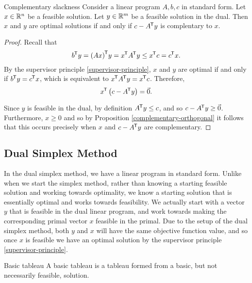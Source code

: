 \begin{thm}{Complementary slackness}\label{complementary-slackness}\proofbreak
    Consider a linear program $A, b, c$ in standard form. Let $x \in \mathbb{R}^n$ be a feasible solution. Let $y \in \mathbb{R}^m$ be a feasible solution in the dual. Then $x$ and $y$ are optimal solutions if and only if $c - {A}^{\mkern-1.5mu\mathsf{T}}y$ is complentary to $x$.
\end{thm}

\begin{proof}
    Recall that
    \begin{align*}
        {b}^{\mkern-1.5mu\mathsf{T}}y = {(Ax)}^{\mkern-1.5mu\mathsf{T}}y = {x}^{\mkern-1.5mu\mathsf{T}}{A}^{\mkern-1.5mu\mathsf{T}}y \leq {x}^{\mkern-1.5mu\mathsf{T}}c = {c}^{\mkern-1.5mu\mathsf{T}}x.
    \end{align*}
    By the supervisor principle \ref{supervisor-principle}, $x$ and $y$ are optimal if and only if ${b}^{\mkern-1.5mu\mathsf{T}}y = {c}^{\mkern-1.5mu\mathsf{T}}x$, which is equivalent to ${x}^{\mkern-1.5mu\mathsf{T}}{A}^{\mkern-1.5mu\mathsf{T}}y = {x}^{\mkern-1.5mu\mathsf{T}}c$. Therefore,
    \begin{align*}
        {x}^{\mkern-1.5mu\mathsf{T}}\left(c - {A}^{\mkern-1.5mu\mathsf{T}}y\right) = \vec{0}.
    \end{align*}

    Since $y$ is feasible in the dual, by definition ${A}^{\mkern-1.5mu\mathsf{T}}y \leq c$, and so $c - {A}^{\mkern-1.5mu\mathsf{T}}y \geq \vec{0}$. Furthermore, $x \geq 0$ and so by Proposition \ref{complementary-orthogonal} it follows that this occurs precisely when $x$ and $c - {A}^{\mkern-1.5mu\mathsf{T}}y$ are complementary.
\end{proof}

\subsection{Dual Simplex Method}

In the dual simplex method, we have a linear program in standard form. Unlike when we start the simplex method, rather than knowing a starting feasible solution and working towards optimality, we know a starting solution that is essentially optimal and works towards feasibility. We actually start with a vector $y$ that is feasible in the dual linear program, and work towards making the corresponding primal vector $x$ feasible in the primal. Due to the setup of the dual simplex method, both $y$ and $x$ will have the same objective function value, and so once $x$ is feasible we have an optimal solution by the supervisor principle \ref{supervisor-principle}.

\begin{defn}{Basic tableau}\proofbreak
    A basic tableau is a tableau formed from a basic, but not necessarily feasible, solution.
\end{defn}

